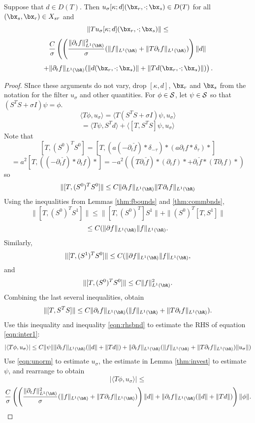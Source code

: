 \begin{prop}
  \label{thm:tl2}
  Suppose that $d \in D(T)$. Then
  $u_{\sigma}[\kappa;d](\bx_r,\cdot;\bx_s)  \in D(T)$ for all
  $(\bx_s,\bx_r) \in X_{sr}$ and
  \[
    \|Tu_{\sigma}[\kappa;d](\bx_r,\cdot;\bx_s)\| \le
  \]
  \[
    \frac{C}{\sigma}\left(\left(
        \frac{\|\partial_t f\|^2_{L^1(\bR)}}{\sigma}(\|f\|_{L^1(\bR)}+\|T\partial_tf\|_{L^1(\bR)})
      \right)\|d\|\right.
  \]
  \begin{equation}
    \label{eqn:tunorm}
    \left.
    + \|\partial_t  f\|_{L^1(\bR)}(\|d (\bx_r,\cdot;\bx_s)\| +\|Td (\bx_r,\cdot;\bx_s)\|)\right).
  \end{equation}
\end{prop}

\begin{proof}

  SInce these arguments do not vary, drop $[\kappa,d]$, $\bx_r$ and $\bx_s$ from the
  notation for the filter $u_{\sigma}$ and other quantities.
  For $\phi \in {\cal S}$, let $\psi \in {\cal S}$ so that
  $(S^TS + \sigma I)\psi = \phi$.
  \[
    \langle T\phi, u_{\sigma}\rangle = \langle T (S^TS +
    \sigma I)\psi, u_{\sigma}\rangle
  \]
  \begin{equation}
    \label{eqn:inter1}
    =\langle T \psi, S^T d \rangle + \langle [T, S^TS] \psi, u_{\sigma}
    \rangle
  \end{equation}
  Note that
  \[
    [T,(S^0)^TS^0] = [T, (a (-\partial_t\check{f})*
    \delta_{-\tau})*(a \partial_tf *\delta_{\tau})* ]
  \]
  \[
   = a^2[T,
   ( (-\partial_t \check{f})*\partial_tf)*] = -a^2
    ((T \partial_t \check{f})*(\partial_tf)* + \partial_t \check{f}*(T\partial_tf)*)
  \]
  so
  \[
    \|[T,(S^0)^TS^0]\| \le C \|\partial_t f\|_{L^1(\bR)}\|T\partial_t
    f\|_{L^1(\bR)}
  \]
  Using the inequalities from Lemmas \ref{thm:fbounds} and \ref{thm:commbnds},
  \[
    \|[T, (S^0)^TS^1]\| \le \|[T,(S^0)^T]S^1\| + \|(S^0)^T [T,S^1]\|
  \]
  \[
    \le C(\|\partial f\|_{L^1(\bR)}\|f\|_{L^1(\bR)}.
  \]
  Similarly,
  \[
    \|[T, (S^1)^TS^0]\| \le C(\|\partial
    f\|_{L^1(\bR)}\|f\|_{L^1(\bR)},
  \]
  and
  \[
    \|[T, (S^0)^TS^0]\| \le C\|f\|_{L^1(\bR)}^2.
  \]
  Combining the last several inequalities, obtain
  \begin{equation}
    \label{eqn:TScomm}
    \|[T, S^TS]\| \le C\|\partial_t
    f\|_{L^1(\bR)}(\|f\|_{L^1(\bR)}+\|T\partial_t f\|_{L^1(\bR)}).
  \end{equation}
  Use this inequality and inequality \ref{eqn:rhsbnd} to estimate the RHS
  of equation \ref{eqn:inter1}:
  \[
    |\langle T\phi, u_{\sigma}\rangle| \le C\|\psi\|\|\partial_t
    f\|_{L^1(\bR)}(\|d\| + \|Td\|) + \|\partial_t
    f\|_{L^1(\bR)}(\|f\|_{L^1(\bR)}+\|T\partial_t
    f\|_{L^1(\bR)})\|u_{\sigma}\|)
  \]
  Use \ref{eqn:unorm} to estimate $u_{\sigma}$, the estimate in Lemma
  \ref{thm:invest} to estimate $\psi$, and rearrange to obtain
  \[
    |\langle T\phi, u_{\sigma} \rangle| \le
  \]
  \[
    \frac{C}{\sigma}\left(\left(
        \frac{\|\partial_t f\|^2_{L^1(\bR)}}{\sigma}(\|f\|_{L^1(\bR)}+\|T\partial_tf\|_{L^1(\bR)})
      \right)\|d\| + \|\partial_t  f\|_{L^1(\bR)}(\|d\|
      +\|Td\|)\right)
    \|\phi\|.
  \]

\end{proof}


